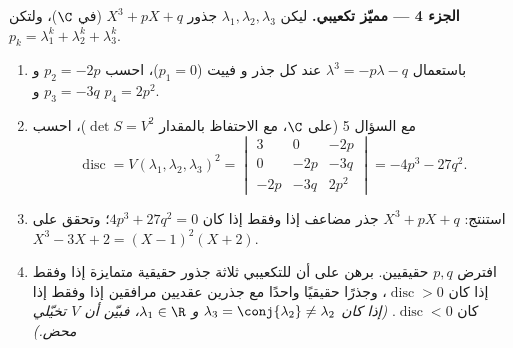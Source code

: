 \begin{problem}
\medskip
\noindent\textbf{الجزء 4 --- مميّز  تكعيبي.} ليكن
$\lambda_1, \lambda_2, \lambda_3$ جذور $X^3
+ pX + q$ (في $\C$)، ولتكن $p_k = \lambda_1^k + \lambda_2^k + \lambda_3^k$.
\begin{enumerate}[resume]
  \item باستعمال $\lambda^3 = -p\lambda - q$ عند كل جذر و
        فييت ($p_1 = 0$)، احسب $p_2 = -2p$ و $p_3 = -3q$ و
        $p_4 = 2p^2$.
  \item مع السؤال 5 (على $\C$، مع الاحتفاظ بالمقدار $\det S = V^2$)،
        احسب
        \[
        \operatorname{disc} = V(\lambda_1, \lambda_2,
        \lambda_3)^2 = \begin{vmatrix}
        3 & 0 & -2p\\
        0 & -2p & -3q\\
        -2p & -3q & 2p^2
        \end{vmatrix}
        = -4p^3 - 27q^2 .
        \]
  \item استنتج:  $X^3 + pX + q$ جذر مضاعف إذا وفقط
        إذا كان $4p^3 + 27q^2 = 0$؛ وتحقق على $X^3 - 3X + 2 = (X -
        1)^2(X + 2)$.
  \item افترض $p, q$ حقيقيين. برهن على أن للتكعيبي ثلاثة
        جذور حقيقية متمايزة إذا وفقط إذا كان $\operatorname{disc}
        > 0$، وجذرًا حقيقيًا واحدًا مع جذرين عقديين مرافقين إذا
        وفقط إذا كان $\operatorname{disc} < 0$. \emph{(إذا كان
        $\lambda_3 = \conj{\lambda_2} \neq \lambda_2$ و
        $\lambda_1 \in \R$، فبيّن أن $V$ تخيّلي محض.)}
\end{enumerate}


\end{problem}
